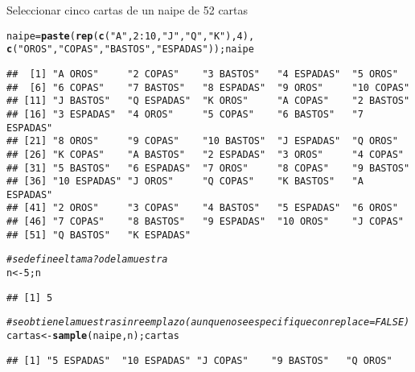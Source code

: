 \documentclass[10pt,a4paper]{article}\usepackage[]{graphicx}\usepackage[]{color}
\makeatletter
\newcommand{\hlnum}[1]{\textcolor[rgb]{0.686,0.059,0.569}{#1}}%
\newcommand{\hlstr}[1]{\textcolor[rgb]{0.192,0.494,0.8}{#1}}%
\newcommand{\hlcom}[1]{\textcolor[rgb]{0.678,0.584,0.686}{\textit{#1}}}%
\newcommand{\hlopt}[1]{\textcolor[rgb]{0,0,0}{#1}}%
\newcommand{\hlstd}[1]{\textcolor[rgb]{0.345,0.345,0.345}{#1}}%
\newcommand{\hlkwb}[1]{\textcolor[rgb]{0.69,0.353,0.396}{#1}}%
\newcommand{\hlkwd}[1]{\textcolor[rgb]{0.737,0.353,0.396}{\textbf{#1}}}%
\newenvironment{kframe}{%
 \def\at@end@of@kframe{}%
 \ifinner\ifhmode%
  \def\at@end@of@kframe{\end{minipage}}%
  \begin{minipage}{\columnwidth}%
 \fi\fi%
 \def\FrameCommand##1{\hskip\@totalleftmargin \hskip-\fboxsep
 \colorbox{shadecolor}{##1}\hskip-\fboxsep
     \hskip-\linewidth \hskip-\@totalleftmargin \hskip\columnwidth}%
 \MakeFramed {\advance\hsize-\width
   \@totalleftmargin\z@ \linewidth\hsize
   \@setminipage}}%
 {\par\unskip\endMakeFramed%
 \at@end@of@kframe}
\newenvironment{knitrout}{}{} %
\makeatother
\begin{document}
Seleccionar cinco cartas de un naipe de 52 cartas 
\begin{knitrout}
\color{fgcolor}\begin{kframe}
\begin{alltt}
\hlstd{naipe} \hlkwb{=} \hlkwd{paste}\hlstd{(}\hlkwd{rep}\hlstd{(}\hlkwd{c}\hlstd{(}\hlstr{"A"}\hlstd{,} \hlnum{2}\hlopt{:}\hlnum{10}\hlstd{,} \hlstr{"J"}\hlstd{,} \hlstr{"Q"}\hlstd{,} \hlstr{"K"}\hlstd{),} \hlnum{4}\hlstd{),}
\hlkwd{c}\hlstd{(}\hlstr{"OROS"}\hlstd{,}\hlstr{"COPAS"}\hlstd{,} \hlstr{"BASTOS"}\hlstd{,}\hlstr{"ESPADAS"}\hlstd{));naipe}
\end{alltt}
\begin{verbatim}
##  [1] "A OROS"     "2 COPAS"    "3 BASTOS"   "4 ESPADAS"  "5 OROS"    
##  [6] "6 COPAS"    "7 BASTOS"   "8 ESPADAS"  "9 OROS"     "10 COPAS"  
## [11] "J BASTOS"   "Q ESPADAS"  "K OROS"     "A COPAS"    "2 BASTOS"  
## [16] "3 ESPADAS"  "4 OROS"     "5 COPAS"    "6 BASTOS"   "7 ESPADAS" 
## [21] "8 OROS"     "9 COPAS"    "10 BASTOS"  "J ESPADAS"  "Q OROS"    
## [26] "K COPAS"    "A BASTOS"   "2 ESPADAS"  "3 OROS"     "4 COPAS"   
## [31] "5 BASTOS"   "6 ESPADAS"  "7 OROS"     "8 COPAS"    "9 BASTOS"  
## [36] "10 ESPADAS" "J OROS"     "Q COPAS"    "K BASTOS"   "A ESPADAS" 
## [41] "2 OROS"     "3 COPAS"    "4 BASTOS"   "5 ESPADAS"  "6 OROS"    
## [46] "7 COPAS"    "8 BASTOS"   "9 ESPADAS"  "10 OROS"    "J COPAS"   
## [51] "Q BASTOS"   "K ESPADAS"
\end{verbatim}
\begin{alltt}
\hlcom{# se define el tama?o de la muestra }
\hlstd{n} \hlkwb{<-} \hlnum{5}\hlstd{; n}
\end{alltt}
\begin{verbatim}
## [1] 5
\end{verbatim}
\begin{alltt}
\hlcom{# se obtiene la muestra sin reemplazo (aunque no se especifique con replace=FALSE) }
\hlstd{cartas} \hlkwb{<-} \hlkwd{sample}\hlstd{(naipe, n) ; cartas}
\end{alltt}
\begin{verbatim}
## [1] "5 ESPADAS"  "10 ESPADAS" "J COPAS"    "9 BASTOS"   "Q OROS"
\end{verbatim}
\end{kframe}
\end{knitrout}
\end{document}
